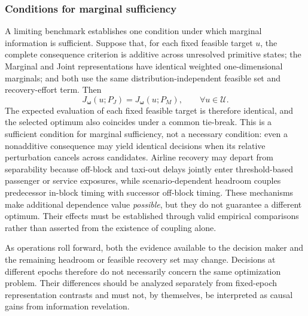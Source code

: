 \subsubsection{Conditions for marginal sufficiency}

A limiting benchmark establishes one condition under which marginal information is sufficient. Suppose that, for each fixed feasible target $u$, the complete consequence criterion is additive across unresolved primitive states; the Marginal and Joint representations have identical weighted one-dimensional marginals; and both use the same distribution-independent feasible set and recovery-effort term. Then
\begin{equation}
J_{\boldsymbol\omega}(u;P_J)
=J_{\boldsymbol\omega}(u;P_M),\qquad
\forall u\in\mathcal U.
\label{eq:separable_marginal_sufficiency}
\end{equation}
The expected evaluation of each fixed feasible target is therefore identical, and the selected optimum also coincides under a common tie-break. This is a sufficient condition for marginal sufficiency, not a necessary condition: even a nonadditive consequence may yield identical decisions when its relative perturbation cancels across candidates. Airline recovery may depart from separability because off-block and taxi-out delays jointly enter threshold-based passenger or service exposures, while scenario-dependent headroom couples predecessor in-block timing with successor off-block timing. These mechanisms make additional dependence value \emph{possible}, but they do not guarantee a different optimum. Their effects must be established through valid empirical comparisons rather than asserted from the existence of coupling alone.

As operations roll forward, both the evidence available to the decision maker and the remaining headroom or feasible recovery set may change. Decisions at different epochs therefore do not necessarily concern the same optimization problem. Their differences should be analyzed separately from fixed-epoch representation contrasts and must not, by themselves, be interpreted as causal gains from information revelation.
